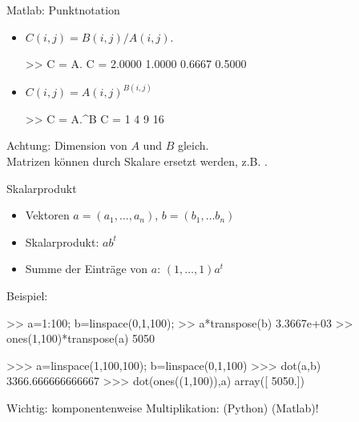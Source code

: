 \documentclass[hyperref={xetex}]{beamer}
\begin{document}
%
%
\begin{frame}[fragile]{Matlab: Punktnotation}
\begin{itemize}
\item $C(i,j)=B(i,j)/A(i,j)$.
\begin{matlabin}
>> C = A.\B
C =
    2.0000    1.0000
    0.6667    0.5000
\end{matlabin}
\item $C(i,j)=A(i,j)^{B(i,j)}$
\begin{matlabin}
>> C = A.^B
C =
     1     4
     9    16
\end{matlabin}
\end{itemize}
\alert{Achtung:} Dimension von $A$ und $B$ gleich. \\Matrizen können durch
Skalare ersetzt werden, z.B. .
\end{frame}
%
%
\begin{frame}[fragile]{Skalarprodukt}
\begin{itemize}
 \item Vektoren $a=(a_1, \dots ,a_n)$, $b=(b_1, \dots b_n)$ \\
\item Skalarprodukt: $a b^t$\\
\item Summe der Einträge von $a$: $(1, \dots , 1) a^t$\\
\end{itemize}
Beispiel:
\begin{matlabin}
>> a=1:100; b=linspace(0,1,100);
>> a*transpose(b)
   3.3667e+03
>> ones(1,100)*transpose(a)
        5050
\end{matlabin} 
\begin{pyin}
>>> a=linspace(1,100,100); b=linspace(0,1,100)
>>> dot(a,b)
3366.666666666667
>>> dot(ones((1,100)),a)
array([ 5050.])
\end{pyin}
\alert{Wichtig:} komponentenweise Multiplikation: \isage{*}(Python) (Matlab)!
\end{frame}
\end{document}
